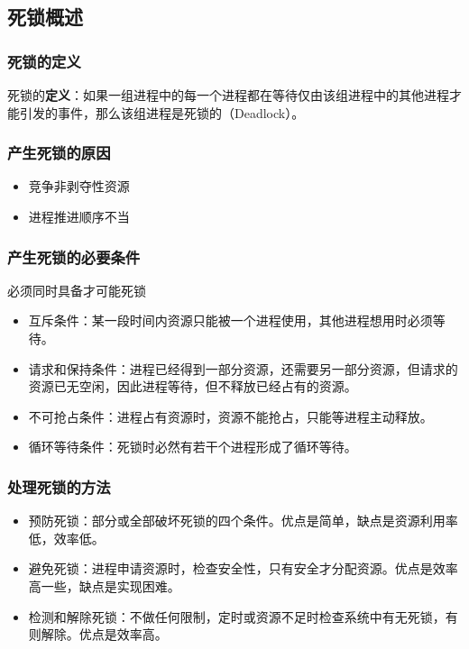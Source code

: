 \documentclass[12pt, a4paper, oneside]{ctexart}
\begin{document}
\subsection{死锁概述}

\subsubsection{死锁的定义}

死锁的\textbf{定义}：如果一组进程中的每一个进程都在等待仅由该组进程中的其他进程才能引发的事件，那么该组进程是死锁的（Deadlock）。

\subsubsection{产生死锁的原因}
\begin{itemize}
    \item 竞争非剥夺性资源
    \item 进程推进顺序不当
\end{itemize}

\subsubsection{产生死锁的必要条件}

必须同时具备才可能死锁
\begin{itemize}
    \item 互斥条件：某一段时间内资源只能被一个进程使用，其他进程想用时必须等待。
    \item 请求和保持条件：进程已经得到一部分资源，还需要另一部分资源，但请求的资源已无空闲，因此进程等待，但不释放已经占有的资源。
    \item 不可抢占条件：进程占有资源时，资源不能抢占，只能等进程主动释放。
    \item 循环等待条件：死锁时必然有若干个进程形成了循环等待。
\end{itemize}

\subsubsection{处理死锁的方法}

\begin{itemize}
    \item 预防死锁：部分或全部破坏死锁的四个条件。优点是简单，缺点是资源利用率低，效率低。
    \item 避免死锁：进程申请资源时，检查安全性，只有安全才分配资源。优点是效率高一些，缺点是实现困难。
    \item 检测和解除死锁：不做任何限制，定时或资源不足时检查系统中有无死锁，有则解除。优点是效率高。
\end{itemize}
\end{document}
